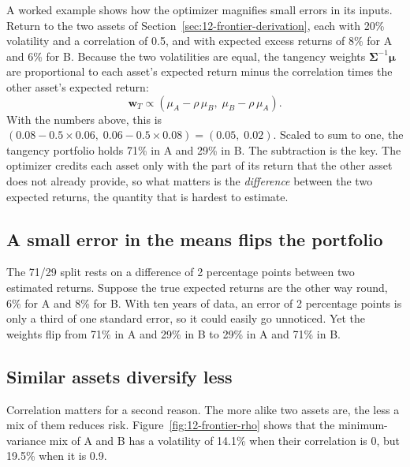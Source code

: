 A worked example shows how the optimizer magnifies small errors in its inputs. Return to the two assets of Section~\ref{sec:12-frontier-derivation}, each with 20\% volatility and a correlation of 0.5, and with expected excess returns of 8\% for A and 6\% for B. Because the two volatilities are equal, the tangency weights $\boldsymbol{\Sigma}^{-1}\boldsymbol{\mu}$ are proportional to each asset's expected return minus the correlation times the other asset's expected return:
\begin{equation}
  \mathbf{w}_T \propto (\mu_A - \rho\,\mu_B,\; \mu_B - \rho\,\mu_A).
  \label{eq:12-two-weights}
\end{equation}
With the numbers above, this is $(0.08 - 0.5 \times 0.06,\; 0.06 - 0.5 \times 0.08) = (0.05,\; 0.02)$. Scaled to sum to one, the tangency portfolio holds 71\% in A and 29\% in B. The subtraction is the key. The optimizer credits each asset only with the part of its return that the other asset does not already provide, so what matters is the \emph{difference} between the two expected returns, the quantity that is hardest to estimate.

\subsection{A small error in the means flips the portfolio}

The 71/29 split rests on a difference of 2 percentage points between two estimated returns. Suppose the true expected returns are the other way round, 6\% for A and 8\% for B. With ten years of data, an error of 2 percentage points is only a third of one standard error, so it could easily go unnoticed. Yet the weights flip from 71\% in A and 29\% in B to 29\% in A and 71\% in B.

\subsection{Similar assets diversify less}

Correlation matters for a second reason. The more alike two assets are, the less a mix of them reduces risk. Figure~\ref{fig:12-frontier-rho} shows that the minimum-variance mix of A and B has a volatility of 14.1\% when their correlation is 0, but 19.5\% when it is 0.9. 

